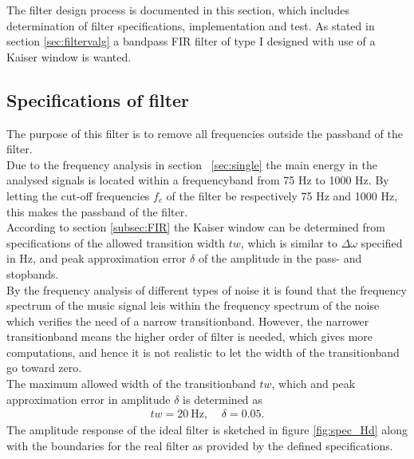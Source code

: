 The filter design process is documented in this section, which includes determination of filter specifications, implementation and test. As stated in section \ref{sec:filtervalg} a bandpass FIR filter of type I designed with use of a Kaiser window is wanted.

\subsection{Specifications of filter} \label{sec:FIRspec} 
The purpose of this filter is to remove all frequencies outside the passband of the filter.  \\
Due to the frequency analysis in section ~\ref{sec:single} the main energy in the analysed signals is located within a frequencyband from 75 Hz to 1000 Hz.  
By letting the cut-off frequencies $f_c$ of the filter be respectively 75 Hz and 1000 Hz, this makes the passband of the filter. \\
According to section \ref{subsec:FIR} the Kaiser window can be determined from specifications of the allowed transition width $tw$, which is similar to $\Delta \omega$ specified in Hz, and peak approximation error $\delta$ of the amplitude in the pass- and stopbands. \\ 
By the frequency analysis of different types of noise it is found that the frequency spectrum of the music signal leis within the frequency spectrum of the noise which verifies the need of a narrow transitionband. However, the narrower transitionband means the higher order of filter is needed, which gives more computations, and hence it is not realistic to let the width of the transitionband go toward zero.  \\
The maximum allowed width of the transitionband $tw$, which and peak approximation error in amplitude $\delta$ is determined as
\begin{align}
tw = 20 \ \text{Hz}, \ \ \ \ \  \delta = 0.05. 
\end{align}
The amplitude response of the ideal filter is sketched in figure \ref{fig:spec_Hd} along with the boundaries for the real filter as provided by the defined specifications.      
